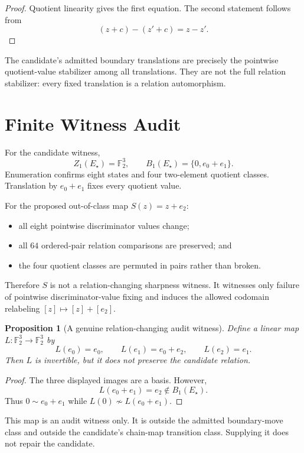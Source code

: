\documentclass[11pt]{article}
\newtheorem{proposition}{Proposition}
\newcommand{\Ftwo}{\mathbb F_2}
\begin{document}
\begin{proof}
Quotient linearity gives the first equation. The second statement follows
from
\[
(z+c)-(z'+c)=z-z'.
\]
\end{proof}

The candidate's admitted boundary translations are precisely the pointwise
quotient-value stabilizer among all translations. They are not the full
relation stabilizer: every fixed translation is a relation automorphism.

\section{Finite Witness Audit}

For the candidate witness,
\[
Z_1(E_\star)=\Ftwo^3,\qquad
B_1(E_\star)=\{0,e_0+e_1\}.
\]
Enumeration confirms eight states and four two-element quotient classes.
Translation by \(e_0+e_1\) fixes every quotient value.

For the proposed out-of-class map \(S(z)=z+e_2\):
\begin{itemize}[leftmargin=*]
  \item all eight pointwise discriminator values change;
  \item all \(64\) ordered-pair relation comparisons are preserved; and
  \item the four quotient classes are permuted in pairs rather than broken.
\end{itemize}

Therefore \(S\) is not a relation-changing sharpness witness. It witnesses only
failure of pointwise discriminator-value fixing and induces the allowed
codomain relabeling \([z]\mapsto[z]+[e_2]\).

\begin{proposition}[A genuine relation-changing audit witness]
Define a linear map \(L:\Ftwo^3\to\Ftwo^3\) by
\[
L(e_0)=e_0,\qquad L(e_1)=e_0+e_2,\qquad L(e_2)=e_1.
\]
Then \(L\) is invertible, but it does not preserve the candidate relation.
\end{proposition}

\begin{proof}
The three displayed images are a basis. However,
\[
L(e_0+e_1)=e_2\notin B_1(E_\star).
\]
Thus \(0\sim e_0+e_1\) while
\(L(0)\not\sim L(e_0+e_1)\).
\end{proof}

This map is an audit witness only. It is outside the admitted boundary-move
class and outside the candidate's chain-map transition class. Supplying it
does not repair the candidate.
\end{document}
